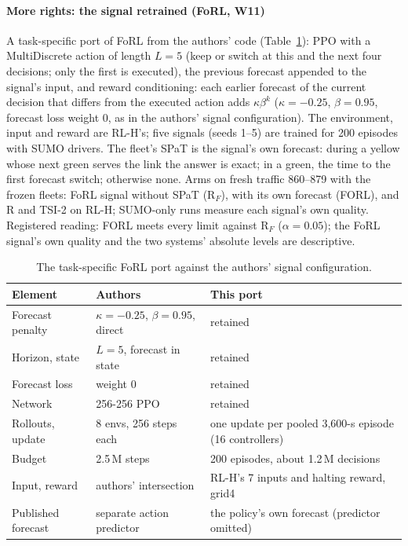 \paragraph{More rights: the signal retrained (FoRL, W11)} A task-specific port of FoRL \cite{gerner2026forl} from the authors' code
(Table~\ref{tab:forlport}): PPO with a
MultiDiscrete action of length $L=5$ (keep or switch at this and the next four decisions; only the first is executed), the previous forecast
appended to the signal's input, and reward conditioning: each earlier forecast of the current decision that differs from the executed
action adds $\kappa\beta^{k}$ ($\kappa=-0.25$, $\beta=0.95$, forecast loss weight 0, as in the authors' signal configuration). The
environment, input and reward are RL-H's; five signals (seeds 1--5) are trained for 200 episodes with SUMO drivers. The fleet's SPaT is
the signal's own forecast: during a yellow whose next green serves the link the answer is exact; in a green, the time to the first
forecast switch; otherwise none. Arms on fresh traffic 860--879 with the frozen fleets: FoRL signal without SPaT (R$_F$), with its own
forecast (FORL), and R and TSI-2 on RL-H; SUMO-only runs measure each signal's own quality. Registered reading: FORL meets every limit
against R$_F$ ($\alpha=0.05$); the FoRL signal's own quality and the two systems' absolute levels are descriptive.
\begin{table}[t]\centering\footnotesize\setlength{\tabcolsep}{3pt}
\caption{The task-specific FoRL port against the authors' signal configuration.}\label{tab:forlport}
\begin{tabular}{@{}p{}p{}p{}@{}}\toprule
Element & Authors & This port\\\midrule
Forecast penalty & $\kappa=-0.25$, $\beta=0.95$, direct & retained\\
Horizon, state & $L=5$, forecast in state & retained\\
Forecast loss & weight 0 & retained\\
Network & 256-256 PPO & retained\\
Rollouts, update & 8 envs, 256 steps each & one update per pooled 3,600-s episode (16 controllers)\\
Budget & 2.5\,M steps & 200 episodes, about 1.2\,M decisions\\
Input, reward & authors' intersection & RL-H's 7 inputs and halting reward, grid4\\
Published forecast & separate action predictor & the policy's own forecast (predictor omitted)\\\bottomrule
\end{tabular}\end{table}

